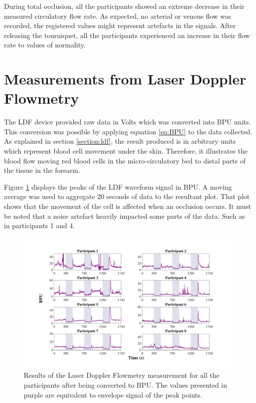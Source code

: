 During total occlusion, all the participants showed an extreme decrease in their measured circulatory flow rate. As expected, no arterial or venous flow was recorded, the registered values might represent artefacts in the signals. After releasing the tourniquet, all the participants experienced an increase in their flow rate to values of normality. 


\section{Measurements from Laser Doppler Flowmetry}
\label{section results 7}
The LDF device provided raw data in Volts which was converted into BPU units. This conversion was possible by applying equation \ref{eq:BPU} to the data collected.  As explained in section \ref{section:ldf}, the result produced is in arbitrary units which represent blood cell movement under the skin. Therefore, it illustrates the blood flow moving red blood cells in the micro-circulatory bed to distal parts of the tissue in the forearm.

Figure \ref{fig:LDF_flow} displays the peaks of the LDF waveform signal in BPU. A moving average was used to aggregate 20 seconds of data to the resultant plot. That plot shows that the movement of the cell is affected when an occlusion occurs. It must be noted that a noise artefact heavily impacted some parts of the data. Such as in participants 1 and 4.

\begin{figure}[!htb]
	\centering
	\includegraphics[width=\textwidth,height=\textheight,keepaspectratio,trim={2cm 0cm 2cm 0 cm},clip]{figure17}    
	\caption[Results of the LDF in BPU]{Results of the Laser Doppler Flowmetry measurement for all the participants after being converted to BPU. The values presented in purple are equivalent to envelope signal of the peak points.}
	\label{fig:LDF_flow}
\end{figure}

